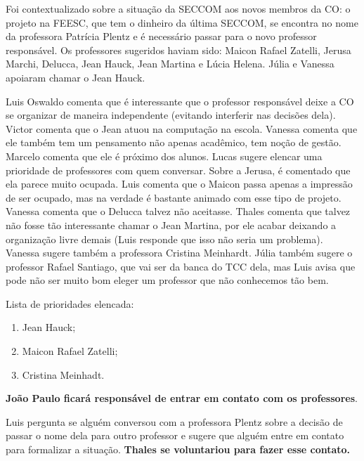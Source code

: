 \documentclass{ata-calico}
\begin{document}
\maketitle


Foi contextualizado sobre a situação da SECCOM aos novos membros da CO\@: o
projeto na FEESC, que tem o dinheiro da última SECCOM, se encontra no nome da
professora Patrícia Plentz e é necessário passar para o novo professor
responsável. Os professores sugeridos haviam sido: Maicon Rafael Zatelli,
Jerusa Marchi, Delucca, Jean Hauck, Jean Martina e Lúcia Helena. Júlia e
Vanessa apoiaram chamar o Jean Hauck.

Luis Oswaldo comenta que é interessante que o professor responsável deixe a CO
se organizar de maneira independente (evitando interferir nas decisões dela).
Victor comenta que o Jean atuou na computação na escola. Vanessa comenta que
ele também tem um pensamento não apenas acadêmico, tem noção de gestão. Marcelo
comenta que ele é próximo dos alunos. Lucas sugere elencar uma prioridade de
professores com quem conversar.  Sobre a Jerusa, é comentado que ela parece
muito ocupada. Luis comenta que o Maicon passa apenas a impressão de ser
ocupado, mas na verdade é bastante animado com esse tipo de projeto. Vanessa
comenta que o Delucca talvez não aceitasse. Thales comenta que talvez não fosse
tão interessante chamar o Jean Martina, por ele acabar deixando a organização
livre demais (Luis responde que isso não seria um problema). Vanessa sugere
também a professora Cristina Meinhardt. Júlia também sugere o professor Rafael
Santiago, que vai ser da banca do TCC dela, mas Luis avisa que pode não ser
muito bom eleger um professor que não conhecemos tão bem.

Lista de prioridades elencada:

\begin{enumerate}
    \item Jean Hauck;
    \item Maicon Rafael Zatelli;
    \item Cristina Meinhadt.
\end{enumerate}

\textbf{João Paulo ficará responsável de entrar em contato com os professores}.

Luis pergunta se alguém conversou com a professora Plentz sobre a decisão de
passar o nome dela para outro professor e sugere que alguém entre em contato
para formalizar a situação. \textbf{Thales se voluntariou para fazer esse
contato.}
\end{document}
